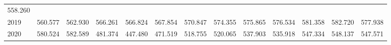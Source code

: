 \begin{tabular}{lllllllllllll}
  \multicolumn{1}{r}{558.260} \\
\multicolumn{1}{l}{\hspace{1em}2019} &
  \multicolumn{1}{|r}{560.577} &
  \multicolumn{1}{r}{562.930} &
  \multicolumn{1}{r}{566.261} &
  \multicolumn{1}{r}{566.824} &
  \multicolumn{1}{r}{567.854} &
  \multicolumn{1}{r}{570.847} &
  \multicolumn{1}{r}{574.355} &
  \multicolumn{1}{r}{575.865} &
  \multicolumn{1}{r}{576.534} &
  \multicolumn{1}{r}{581.358} &
  \multicolumn{1}{r}{582.720} &
  \multicolumn{1}{r}{577.938} \\
\multicolumn{1}{l}{\hspace{1em}2020} &
  \multicolumn{1}{|r}{580.524} &
  \multicolumn{1}{r}{582.589} &
  \multicolumn{1}{r}{481.374} &
  \multicolumn{1}{r}{447.480} &
  \multicolumn{1}{r}{471.519} &
  \multicolumn{1}{r}{518.755} &
  \multicolumn{1}{r}{520.065} &
  \multicolumn{1}{r}{537.903} &
  \multicolumn{1}{r}{535.918} &
  \multicolumn{1}{r}{547.334} &
  \multicolumn{1}{r}{548.137} &
  \multicolumn{1}{r}{547.571} \\
\cline{1-13}
\end{tabular}
